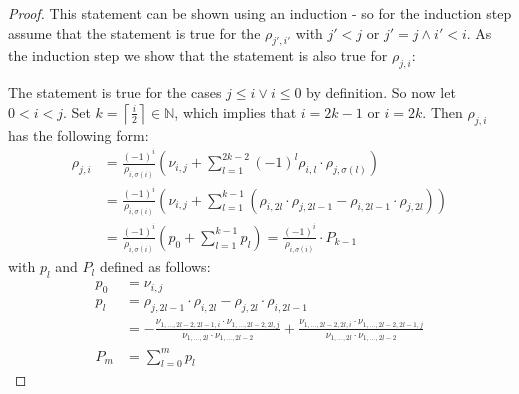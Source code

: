 \documentclass[../SymplecticSimplices.tex]{subfiles}
\begin{document}
\begin{proof}
  This statement can be shown using an induction - so for the induction step assume that the statement is true for the \( \rho_{j', i'} \) with \( j' < j \) or \( j' = j \land i' < i \). As the induction step we show that the statement is also true for \( \rho_{j, i} \):

  The statement is true for the cases  \( j \leq i \lor i \leq 0 \) by definition. So now let \( 0 < i < j \). Set \( k = \left\lceil \frac{i}{2} \right\rceil \in \mathbb{N} \), which implies that \( i = 2k - 1 \) or \( i = 2k \). Then \( \rho_{j,i} \) has the following form:
\begin{align*}
  \rho_{j, i} & = \frac{\left( -1 \right) ^ i}{\rho_{i, \sigma\left( i \right)}} \left( \nu_{i,j} + \sum \limits _{l=1} ^{2k-2} \left( -1 \right) ^l \rho_{i, l} \cdot \rho_{j, \sigma \left( l \right)} \right) \\
              & = \frac{\left( -1 \right) ^ i}{\rho_{i, \sigma\left( i \right)}} \left( \nu_{i,j} + \sum \limits _{l=1} ^{k-1} \left( \rho_{i, 2l} \cdot \rho_{j, 2l-1} - \rho_{i, 2l-1} \cdot \rho_{j, 2l} \right) \right) \\
              & = \frac{\left( -1 \right) ^ i}{\rho_{i, \sigma\left( i \right)}} \left( p_0 + \sum \limits _{l=1} ^{k-1} p_l \right) = \frac{\left( -1 \right) ^ i}{\rho_{i, \sigma\left( i \right)}} \cdot P_{k-1}
\end{align*}
with \( p_l \) and \( P_l \) defined as follows:
\begin{align*}
  p_0 & = \nu_{i,j} \\
  p_l & = \rho_{j, 2l-1} \cdot \rho_{i, 2l} - \rho_{j, 2l} \cdot \rho_{i, 2l-1}\\
      & = - \frac{\nu_{1, \dots, 2l-2,2l-1,i} \cdot \nu_{1, \dots, 2l-2, 2l, j}}{\nu_{1, \dots, 2l} \cdot \nu_{1, \dots, 2l-2}} + \frac{\nu_{1, \dots, 2l-2,2l,i} \cdot \nu_{1, \dots, 2l-2, 2l-1, j}}{\nu_{1, \dots, 2l} \cdot \nu_{1, \dots, 2l-2}} \\
  P_m & = \sum \limits_{l=0}^m p_l
\end{align*}


\end{proof}
\end{document}
